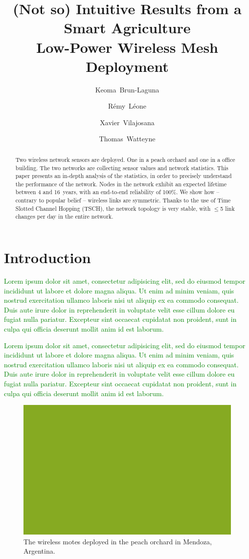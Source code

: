 \documentclass{elsarticle}
\newcommand{\lorem}          {\textcolor{green}{Lorem ipsum dolor sit amet, consectetur adipisicing elit, sed do eiusmod tempor incididunt ut labore et dolore magna aliqua. Ut enim ad minim veniam, quis nostrud exercitation ullamco laboris nisi ut aliquip ex ea commodo consequat. Duis aute irure dolor in reprehenderit in voluptate velit esse cillum dolore eu fugiat nulla pariatur. Excepteur sint occaecat cupidatat non proident, sunt in culpa qui officia deserunt mollit anim id est laborum.}}
\begin{document}
	
\begin{frontmatter}
	
\title{(Not so) Intuitive Results from a Smart Agriculture\\Low-Power Wireless Mesh Deployment}

\author[inria]{Keoma~Brun-Laguna}
\author[inria]{R\'emy~L\'eone}
\author[uoc]{Xavier~Vilajosana}
\author[inria]{Thomas~Watteyne}

\address[inria]{Inria, EVA team, Paris, France}
\address[uoc]{Univ. Oberta de Catalunya, Barcelona, Catalonia, Spain}

\end{frontmatter}

\begin{abstract}
Two wireless network sensors are deployed.
One in a peach orchard and one in a office building.
The two networks are collecting sensor values and network statistics.
This paper presents an in-depth analysis of the statistics, in order to precisely understand the performance of the network.
Nodes in the network exhibit an expected lifetime between 4 and 16~years, with an end-to-end reliability of 100\%.
We show how -- contrary to popular belief -- wireless links are symmetric.
Thanks to the use of Time Slotted Channel Hopping (TSCH), the network topology is very stable, with $\leq$5 link changes per day in the entire network.
\end{abstract}

\section{Introduction}
\label{sec:intro}


\lorem


\lorem

\begin{figure}
    \centering
    \includegraphics[width=\columnwidth]{fake}
    \caption{The wireless motes deployed in the peach orchard in Mendoza, Argentina.}
    \label{fig:orchard}
\end{figure}
\end{document}
